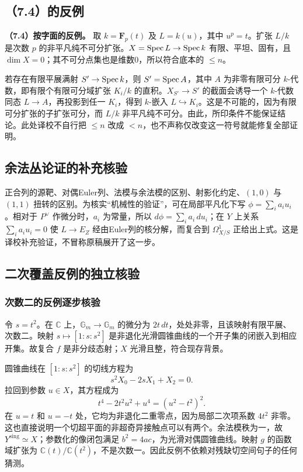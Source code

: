 
\subsection*{（7.4）的反例}
\noindent\textbf{（7.4）按字面的反例。}
取 $k=\mathbf F_p(t)$ 及 $L=k(u)$，其中 $u^p=t$。扩张 $L/k$ 是次数 $p$ 的非平凡纯不可分扩张。$X=\operatorname{Spec} L\to\operatorname{Spec} k$ 有限、平坦、固有，且 $\dim X=0$；其不可分点集也是维数0，所以符合底本的 $\leq n$。

若存在有限平展满射 $S'\to\operatorname{Spec} k$，则 $S'=\operatorname{Spec} A$，其中 $A$ 为非零有限可分 $k$-代数，即有限个有限可分域扩张 $K_i/k$ 的直积。$X_{S'}\to S'$ 的截面会诱导一个 $k$-代数同态 $L\to A$，再投影到任一 $K_i$，得到 $k$-嵌入 $L\hookrightarrow K_i$。这是不可能的，因为有限可分扩张的子扩张可分，而 $L/k$ 非平凡纯不可分。由此，所印条件不能保证结论。此处译校不自行把 $\leq n$ 改成 $<n$，也不声称仅改变这一符号就能修复全部证明。



\subsection*{余法丛论证的补充核验}
正合列的源靶、对偶Euler列、法模与余法模的区别、射影化约定、$(1,0)$ 与 $(1,1)$ 扭转的区别。为核实“机械性的验证”，可在局部平凡化下写 $\phi=\sum_i a_i u_i$。相对于 $P^\vee$ 作微分时，$a_i$ 为常量，所以 $d\phi=\sum_i a_i\,du_i$；在 $Y$ 上关系 $\sum_i a_i u_i=0$ 使 $L\to E_Z$ 经由Euler列的核分解，而复合到 $\Omega^1_{X/S}$ 正给出上式。这是译校补充验证，不冒称原稿展开了这一步。




\subsection*{二次覆盖反例的独立核验}
\subsubsection*{次数二的反例逐步核验}
令 $s=t^2$。在 $\mathbb C$ 上，$\mathbb G_m\to\mathbb G_m$ 的微分为 $2t\,dt$，处处非零，且该映射有限平展、次数二。映射 $s\mapsto[1:s:s^2]$ 是非退化光滑圆锥曲线的一个开子集的闭嵌入到相应开集。故复合 $f$ 是非分歧态射；$X$ 光滑且整，符合现存背景。

圆锥曲线在 $[1:s:s^2]$ 的切线方程为
\[
s^2X_0-2sX_1+X_2=0.
\]
拉回到参数 $u\in X$，其方程成为
\[
t^4-2t^2u^2+u^4=(u^2-t^2)^2.
\]
在 $u=t$ 和 $u=-t$ 处，它均为非退化二重零点，因为局部二次项系数 $4t^2$ 非零。这也直接说明一个切超平面的非超奇异接触点可以有两个。余法模秩为一，故 ${Y^{\mathrm{sing}}}\simeq X$；参数化的像闭包满足 $b^2=4ac$，为光滑对偶圆锥曲线。映射 $g$ 的函数域扩张为 $\mathbb C(t)/\mathbb C(t^2)$，不是次数一。因此反例不依赖对残缺切空间句子的任何猜测。


